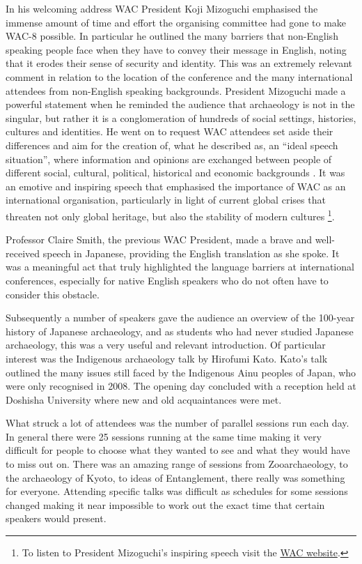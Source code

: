 In his welcoming address WAC President Koji Mizoguchi emphasised the immense amount of time and effort the organising committee had gone to make WAC-8 possible. In particular he outlined the many barriers that non-English speaking people face when they have to convey their message in English, noting that it erodes their sense of security and identity. This was an extremely relevant comment in relation to the location of the conference and the many international attendees from non-English speaking backgrounds. President Mizoguchi made a powerful statement when he reminded the audience that archaeology is not in the singular, but rather it is a conglomeration of hundreds of social settings, histories, cultures and identities. He went on to request WAC attendees set aside their differences and aim for the creation of, what he described as, an “ideal speech situation”, where information and opinions are exchanged between people of different social, cultural, political, historical and economic backgrounds \parencite{addressWAC}. It was an emotive and inspiring speech that emphasised the importance of WAC as an international organisation, particularly in light of current global crises that threaten not only global heritage, but also the stability of modern cultures \footnote{To listen to President Mizoguchi’s inspiring speech visit the \href{http://worldarch.org/blog/presidents-address-at-wac-8/}{WAC website}.}.

Professor Claire Smith, the previous WAC President, made a brave and well-received speech in Japanese, providing the English translation as she spoke. It was a meaningful act that truly highlighted the language barriers at international conferences, especially for native English speakers who do not often have to consider this obstacle. 

Subsequently a number of speakers gave the audience an overview of the 100-year history of Japanese archaeology, and as students who had never studied Japanese archaeology, this was a very useful and relevant introduction. Of particular interest was the Indigenous archaeology talk by Hirofumi Kato. Kato’s talk outlined the many issues still faced by the Indigenous Ainu peoples of Japan, who were only recognised in 2008. The opening day concluded with a reception held at Doshisha University where new and old acquaintances were met.

What struck a lot of attendees was the number of parallel sessions run each day. In general there were 25 sessions running at the same time making it very difficult for people to choose what they wanted to see and what they would have to miss out on. There was an amazing range of sessions from Zooarchaeology, to the archaeology of Kyoto, to ideas of Entanglement, there really was something for everyone. Attending specific talks was difficult as schedules for some sessions changed making it near impossible to work out the exact time that certain speakers would present.

